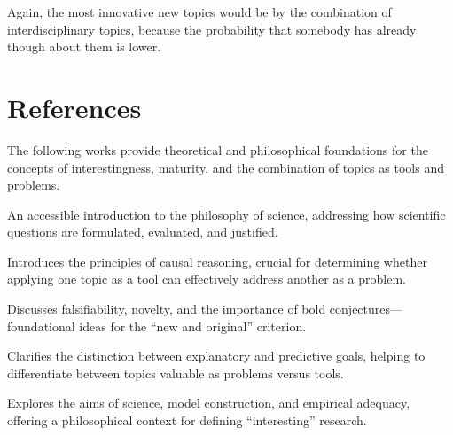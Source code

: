 Again, the most innovative new topics would be by the combination of interdisciplinary topics, because the probability that somebody has already though about them is lower.

%
%

\section*{References}

The following works provide theoretical and philosophical foundations for the concepts of interestingness, maturity, and the combination of topics as tools and problems.

\cite{chalmers2013thing} An accessible introduction to the philosophy of science, addressing how scientific questions are formulated, evaluated, and justified.

\cite{pearl2019book} Introduces the principles of causal reasoning, crucial for determining whether applying one topic as a tool can effectively address another as a problem.

\cite{popper2014conjectures} Discusses falsifiability, novelty, and the importance of bold conjectures—foundational ideas for the “new and original” criterion.

\cite{shmueli2010explain} Clarifies the distinction between explanatory and predictive goals, helping to differentiate between topics valuable as problems versus tools.

\cite{van1980scientific} Explores the aims of science, model construction, and empirical adequacy, offering a philosophical context for defining “interesting” research.

